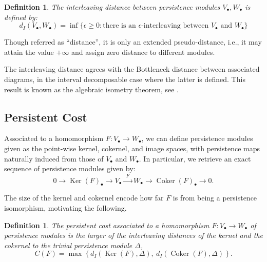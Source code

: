 \documentclass[11pt]{article}
\newtheorem{defn}[thm]{Definition}
\DeclareMathOperator{\Coker}{Coker}
\DeclareMathOperator{\Ker}{Ker}
\newcommand{\bu}{_{\bullet}}
\begin{document}
\begin{defn}
The interleaving distance between persistence modules $V\bu,W\bu$ is defined by:
\[d_I(V_{\bullet}, W_{\bullet}) = \inf\{\epsilon \geq 0: \text{there is  an $\epsilon$-interleaving between $V\bu$ and $W\bu$}\} \]
\end{defn}  
Though referred as \enquote{distance}, it is only an extended pseudo-distance, i.e., it may attain the value $+\infty$ and assign zero distance to different modules. 

The interleaving distance agrees with the Bottleneck distance between associated diagrams, in the interval decomposable case where the latter is defined. 
This result is known as the algebraic isometry theorem, see \cite{lesnick2015theory, oudot2015persistence}.  

\subsection{Persistent Cost}

Associated to a homomorphism $F: V\bu \to W\bu$, we can define persistence modules given as the point-wise kernel, cokernel, and image spaces, with persistence maps naturally induced from those of $V\bu$ and $W\bu$.  In particular, we retrieve an exact sequence of persistence modules given by:
\begin{equation} \label{eqn exact sequence ker coker}  
0 \to \Ker(F)\bu \xrightarrow{~~~}  V\bu \xrightarrow{~~F~~} W\bu  \xrightarrow{~~~} \Coker(F)\bu \to 0. \end{equation}

The size of the kernel and cokernel encode how far $F$ is from being a persistence isomorphism, motivating the following.
\begin{defn}
The persistent cost associated to a homomorphism $F:V\bu \to W\bu$ of persistence modules is 
the larger of the interleaving distances of the kernel and the cokernel to the trivial persistence module $\Delta$,  
\[C(F) = \max\left\{ d_I(\operatorname{Ker}(F), \Delta),\ d_I(\operatorname{Coker}(F), \Delta) \right\}.
\]
\end{defn}
\end{document}
